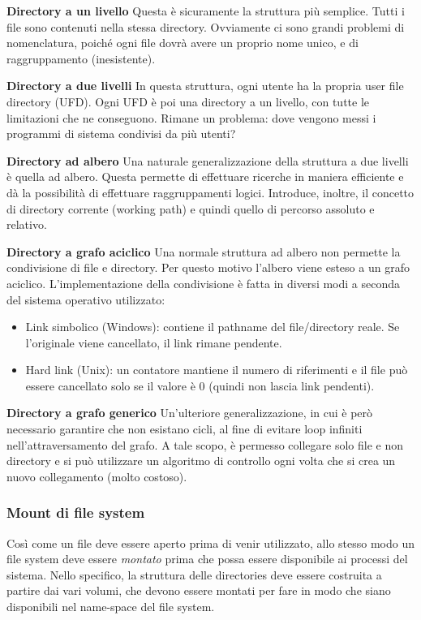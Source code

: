 \documentclass[a4paper]{article}
\begin{document}
\textbf{Directory a un livello}\newline
Questa è sicuramente la struttura più semplice. Tutti i file sono contenuti nella stessa directory. Ovviamente ci sono grandi problemi di nomenclatura, poiché ogni file dovrà avere un proprio nome unico, e di raggruppamento (inesistente).
\newline

\textbf{Directory a due livelli}\newline
In questa struttura, ogni utente ha la propria user file directory (UFD). Ogni UFD è poi una directory a un livello, con tutte le limitazioni che ne conseguono. Rimane un problema: dove vengono messi i programmi di sistema condivisi da più utenti?
\newline

\textbf{Directory ad albero}\newline
Una naturale generalizzazione della struttura a due livelli è quella ad albero. Questa permette di effettuare ricerche in maniera efficiente e dà la possibilità di effettuare raggruppamenti logici. Introduce, inoltre, il concetto di directory corrente (working path) e quindi quello di percorso assoluto e relativo.
\newline

\textbf{Directory a grafo aciclico}
Una normale struttura ad albero non permette la condivisione di file e directory. Per questo motivo l'albero viene esteso a un grafo aciclico. L'implementazione della condivisione è fatta in diversi modi a seconda del sistema operativo utilizzato:
\begin{itemize}
   \item Link simbolico (Windows): contiene il pathname del file/directory reale. Se l'originale viene cancellato, il link rimane pendente.
   \item Hard link (Unix): un contatore mantiene il numero di riferimenti e il file può essere cancellato solo se il valore è 0 (quindi non lascia link pendenti).
\end{itemize}

\textbf{Directory a grafo generico}
Un'ulteriore generalizzazione, in cui è però necessario garantire che non esistano cicli, al fine di evitare loop infiniti nell'attraversamento del grafo. A tale scopo, è permesso collegare solo file e non directory e si può utilizzare un algoritmo di controllo ogni volta che si crea un nuovo collegamento (molto costoso).

\subsubsection{Mount di file system}
Così come un file deve essere aperto prima di venir utilizzato, allo stesso modo un file system deve essere \textit{montato} prima che possa essere disponibile ai processi del sistema. Nello specifico, la struttura delle directories deve essere costruita a partire dai vari volumi, che devono essere montati per fare in modo che siano disponibili nel name-space del file system.
\end{document}

